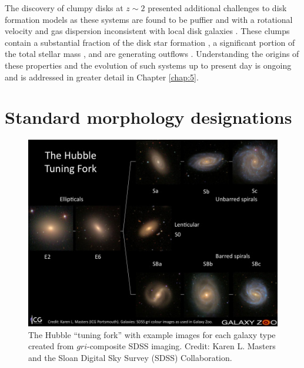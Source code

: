 The discovery of clumpy disks at $z\sim2$ \citep{Elmegreen2005} presented additional challenges to disk formation models as these systems are found to be puffier and with a rotational velocity and gas dispersion inconsistent with local disk galaxies \citep{ForsterSchreiber2009}. These clumps contain a substantial fraction of the disk star formation \citep{Guo2012}, a significant portion of the total stellar mass \citep{WuFoSch2012}, and are generating outflows \citep{Genzel2011}. Understanding the origins of these properties and the evolution of such systems up to present day is ongoing and is addressed in greater detail in Chapter \ref{chap:5}. 




\section{Standard morphology designations}
\label{chap1: standard morphologies}


\begin{figure}
\centering
\includegraphics[width=5in]{Figures/Masters_tuningfork.jpg}
\caption[Hubble tuning fork]{The Hubble ``tuning fork'' with example images for each galaxy type created from $gri$-composite SDSS imaging. Credit: Karen L. Masters and the Sloan Digital Sky Survey (SDSS) Collaboration.}
\label{fig: tuning fork}
\end{figure}

